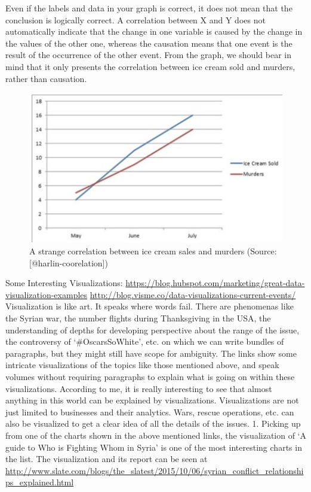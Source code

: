 \documentclass[]{book}
\theoremstyle{definition}
\theoremstyle{definition}
\theoremstyle{definition}
\theoremstyle{remark}
\begin{document}
Even if the labels and data in your graph is correct, it does not mean
that the conclusion is logically correct. A correlation between X and Y
does not automatically indicate that the change in one variable is
caused by the change in the values of the other one, whereas the
causation means that one event is the result of the occurrence of the
other event. From the graph, we should bear in mind that it only
presents the correlation between ice cream sold and murders, rather than
causation.

\begin{figure}
\includegraphics[width=0.7\linewidth]{images/harlin-ice-cream} \caption{A strange correlation between ice cream sales and murders (Source: [@harlin-coorelation])}\label{fig:harlin-ice-cream}
\end{figure}

Some Interesting Visualizations:
\url{https://blog.hubspot.com/marketing/great-data-visualization-examples}
\url{http://blog.visme.co/data-visualizations-current-events/}
Visualization is like art. It speaks where words fail. There are
phenomenas like the Syrian war, the number flights during Thanksgiving
in the USA, the understanding of depths for developing perspective about
the range of the issue, the controversy of `\#OscarsSoWhite', etc. on
which we can write bundles of paragraphs, but they might still have
scope for ambiguity. The links show some intricate visualizations of the
topics like those mentioned above, and speak volumes without requiring
paragraphs to explain what is going on within these visualizations.
According to me, it is really interesting to see that almost anything in
this world can be explained by visualizations. Visualizations are not
just limited to businesses and their analytics. Wars, rescue operations,
etc. can also be visualized to get a clear idea of all the details of
the issues. 1. Picking up from one of the charts shown in the above
mentioned links, the visualization of `A guide to Who is Fighting Whom
in Syria' is one of the most interesting charts in the list. The
visualization and its report can be seen at
\url{http://www.slate.com/blogs/the_slatest/2015/10/06/syrian_conflict_relationships_explained.html}
\end{document}
